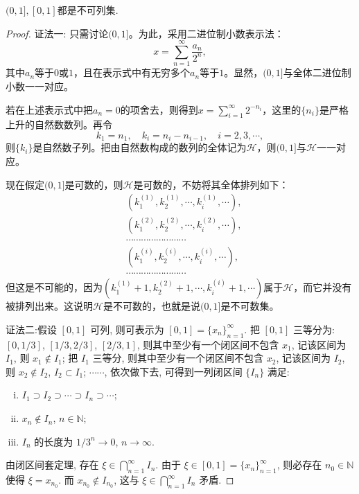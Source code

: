 \documentclass[../../main.tex]{subfiles}%
\begin{document}
\begin{theorem}
\((0,1],[0,1]\)都是不可列集.
\end{theorem}
\begin{proof}

{\color{blue}证法一:}
只需讨论\((0,1]\)。为此，采用二进位制小数表示法：
\[x = \sum_{n = 1}^{\infty}\frac{a_n}{2^n},\]
其中\(a_n\)等于\(0\)或\(1\)，且在表示式中有无穷多个\(a_n\)等于\(1\)。显然，\((0,1]\)与全体二进位制小数一一对应。

若在上述表示式中把\(a_n = 0\)的项舍去，则得到\(x=\sum_{i = 1}^{\infty}2^{-n_i}\)，这里的\(\{n_i\}\)是严格上升的自然数数列。再令
\[k_1 = n_1, \quad k_i = n_i - n_{i - 1}, \quad i = 2,3,\cdots,\]
则\(\{k_i\}\)是自然数子列。把由自然数构成的数列的全体记为\(\mathscr{H}\)，则\((0,1]\)与\(\mathscr{H}\)一一对应。

现在假定\((0,1]\)是可数的，则\(\mathscr{H}\)是可数的，不妨将其全体排列如下：
\begin{align*}
&(k_1^{(1)},k_2^{(1)},\cdots,k_i^{(1)},\cdots),\\
&(k_1^{(2)},k_2^{(2)},\cdots,k_i^{(2)},\cdots),\\
&\cdots\cdots\cdots\cdots\cdots\cdots\cdots\cdots\\
&(k_1^{(i)},k_2^{(i)},\cdots,k_i^{(i)},\cdots),\\
&\cdots\cdots\cdots\cdots\cdots\cdots\cdots\cdots
\end{align*}
但这是不可能的，因为\((k_1^{(1)} + 1,k_2^{(2)} + 1,\cdots,k_i^{(i)} + 1,\cdots)\)属于\(\mathscr{H}\)，而它并没有被排列出来。这说明\(\mathscr{H}\)是不可数的，也就是说\((0,1]\)是不可数集。

{\color{blue}证法二:}假设 $[0, 1]$ 可列, 则可表示为 $[0, 1] = \{x_n\}_{n = 1}^{\infty}$.
把 $[0, 1]$ 三等分为: $[0, 1/3]$, $[1/3, 2/3]$, $[2/3, 1]$, 则其中至少有一个闭区间不包含 $x_1$, 记该区间为 $I_1$, 则 $x_1 \notin I_1$; 把 $I_1$ 三等分, 则其中至少有一个闭区间不包含 $x_2$, 记该区间为 $I_2$, 则 $x_2 \notin I_2$, $I_2 \subset I_1$; $\cdots\cdots$, 依次做下去, 可得到一列闭区间 $\{I_n\}$ 满足:
\begin{enumerate}[(i)]
\item $I_1 \supset I_2 \supset \cdots \supset I_n \supset \cdots$;
\item $x_n \notin I_n$, $n \in \mathbb{N}$;
\item $I_n$ 的长度为 $1/3^n \to 0$, $n \to \infty$.
\end{enumerate}
由闭区间套定理, 存在 $\xi \in \bigcap_{n = 1}^{\infty} I_n$. 由于 $\xi \in [0, 1] = \{x_n\}_{n = 1}^{\infty}$, 则必存在 $n_0 \in \mathbb{N}$ 使得 $\xi = x_{n_0}$. 而 $x_{n_0} \notin I_{n_0}$, 这与 $\xi \in \bigcap_{n = 1}^{\infty} I_n$ 矛盾. 

\end{proof}
\end{document}
